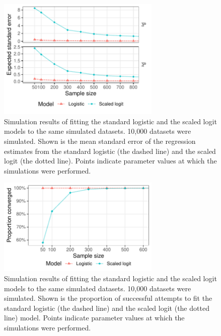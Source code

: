 
\begin{figure}[htp]
	\centering
	\includegraphics[width=0.69\textwidth]{../logistic-plot/vary_nsam_se.pdf}
	\caption{
	Simulation results of fitting the standard logistic and the scaled logit models to the same simulated datasets. 10,000 datasets were simulated. Shown is the mean standard error of the regression estimates from the standard logistic (the dashed line) and the scaled logit (the dotted line). Points indicate parameter values at which the simulations were performed.
	}
	\label{SclrSE}
\end{figure}

\begin{figure}[htp]
	\centering
	\includegraphics[width=0.69\textwidth]{../logistic-plot/vary_nsam.pdf}
	\caption{
	Simulation results of fitting the standard logistic and the scaled logit models to the same simulated datasets. 10,000 datasets were simulated. Shown is the proportion of successful attempts to fit the standard logistic (the dashed line) and the scaled logit (the dotted line) model. Points indicate parameter values at which the simulations were performed.
	}
	\label{SclrConv}
\end{figure}

